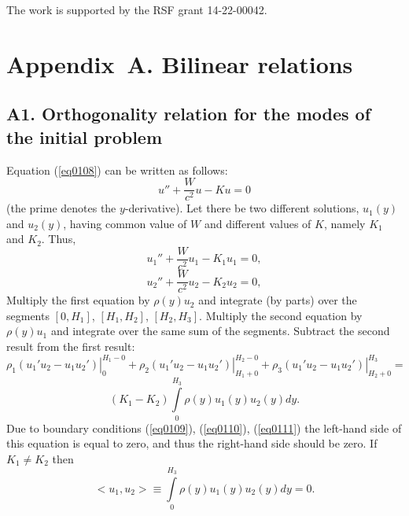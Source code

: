 \documentclass[12pt]{article}
\begin{document}
The work is supported by the RSF grant 14-22-00042.  


 

  





\section*{Appendix~A. Bilinear relations}

\subsection*{A1. Orthogonality relation for the modes of the initial problem}



Equation (\ref{eq0108}) can be written as follows: 
\begin{equation}
u'' + \frac{W}{c^2}  u - K u =0 
\label{eqC01}
\end{equation}
(the prime denotes the $y$-derivative).
Let there be two different solutions, $u_1(y)$ and $u_2(y)$, having common value 
of $W$ and different values of $K$, namely $K_1$ and $K_2$. Thus, 
\[
u_1'' + \frac{W}{c^2}  u_1 - K_1 u_1 =0,
\] 
\[
u_2'' + \frac{W}{c^2}  u_2 - K_2 u_2 =0,
\]
Multiply the first equation by $\rho(y) u_2$ and integrate (by parts) over the  
segments $[0, H_1]$, $[H_1, H_2]$, $[H_2 , H_3]$. Multiply the second equation
by $\rho(y) u_1$ and integrate over the same sum of the segments. 
Subtract the second result from the first result:
\[
\left . \rho_1 (u_1' u_2 - u_1 u_2') \right|_{0}^{H_1-0}
+
\left . \rho_2 (u_1' u_2 - u_1 u_2') \right|_{H_1+0}^{H_2-0}
+
\left . \rho_3 (u_1' u_2 - u_1 u_2') \right|_{H_2+0}^{H_3}
=
\]
\begin{equation}
(K_1 - K_2) \int \limits_0^{H_3} \rho(y) u_1(y) u_2(y) dy .
\label{eqC02}
\end{equation}
Due to boundary conditions (\ref{eq0109}), (\ref{eq0110}), (\ref{eq0111}) the left-hand side 
of this equation is equal to zero, and thus the right-hand side should be zero. 
If $K_1 \ne K_2$  then 
\begin{equation}
<u_1 , u_2> \equiv  \int \limits_0^{H_3} \rho(y) u_1(y) u_2(y) dy =0 .
\label{eqC03}
\end{equation}

\end{document}
